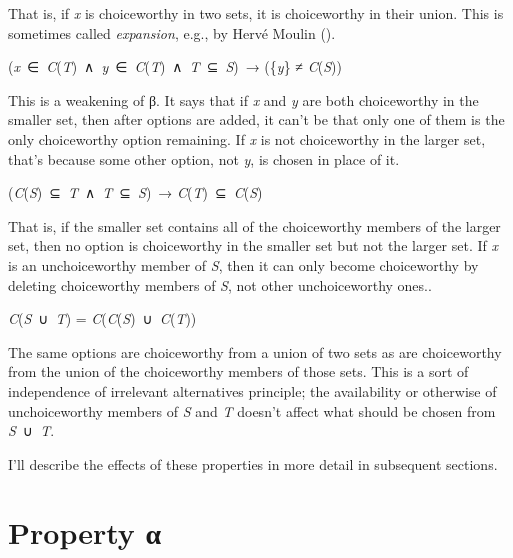 \documentclass[
  11pt,
  letterpaper,
  DIV=11,
  numbers=noendperiod,
  twoside]{scrartcl}
\providecommand{\tightlist}{%
  \setlength{\itemsep}{0pt}\setlength{\parskip}{0pt}}
\begin{document}
That is, if \emph{x} is choiceworthy in two sets, it is choiceworthy in
their union. This is sometimes called \emph{expansion}, e.g., by Hervé
Moulin ().

\begin{description}
\tightlist
\item[Property δ]
(\emph{x}~∈~\emph{C}(\emph{T})~∧~\emph{y}~∈~\emph{C}(\emph{T})~∧~\emph{T}~⊆~\emph{S})~→
(\{\emph{y}\} ≠ \emph{C}(\emph{S}))
\end{description}

This is a weakening of β. It says that if \emph{x} and \emph{y} are both
choiceworthy in the smaller set, then after options are added, it can't
be that only one of them is the only choiceworthy option remaining. If
\emph{x} is not choiceworthy in the larger set, that's because some
other option, not \emph{y}, is chosen in place of it.

\begin{description}
\tightlist
\item[Property Aiz]
(\emph{C}(\emph{S})~⊆~\emph{T}~∧~\emph{T}~⊆~\emph{S})~→
\emph{C}(\emph{T})~⊆~\emph{C}(\emph{S})
\end{description}

That is, if the smaller set contains all of the choiceworthy members of
the larger set, then no option is choiceworthy in the smaller set but
not the larger set. If \emph{x} is an unchoiceworthy member of \emph{S},
then it can only become choiceworthy by deleting choiceworthy members of
\emph{S}, not other unchoiceworthy ones..

\begin{description}
\tightlist
\item[Path Independence]
\emph{C}(\emph{S}~∪~\emph{T}) =
\emph{C}(\emph{C}(\emph{S})~∪~\emph{C}(\emph{T}))
\end{description}

The same options are choiceworthy from a union of two sets as are
choiceworthy from the union of the choiceworthy members of those sets.
This is a sort of independence of irrelevant alternatives principle; the
availability or otherwise of unchoiceworthy members of \emph{S} and
\emph{T} doesn't affect what should be chosen from \emph{S}~∪~\emph{T}.

I'll describe the effects of these properties in more detail in
subsequent sections.

\section{Property α}\label{sec-alpha}
\end{document}
